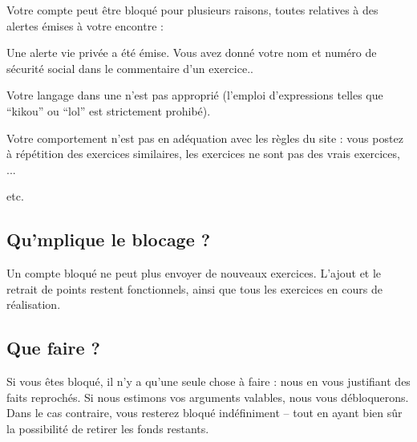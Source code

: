 ﻿Votre compte peut être bloqué pour plusieurs raisons, toutes relatives à des alertes émises à votre encontre :
\item Une alerte vie privée a été émise. Vous avez donné votre nom et numéro de sécurité social dans le commentaire d’un exercice..
\item Votre langage dans une  n’est pas approprié (l’emploi d’expressions telles que “kikou” ou “lol” est strictement prohibé).
\item Votre comportement n’est pas en adéquation avec les règles du site : vous postez à répétition des exercices similaires, les exercices ne sont pas des vrais exercices, ...
\item etc.

\subsection{Qu’mplique le blocage ?}
Un compte bloqué ne peut plus envoyer de nouveaux exercices.
L’ajout et le retrait de points restent fonctionnels, ainsi que tous les exercices en cours de réalisation.

\subsection{Que faire ?}
Si vous êtes bloqué, il n’y a qu’une seule chose à faire : nous  en vous justifiant des faits reprochés. Si nous estimons vos arguments valables, nous vous débloquerons. Dans le cas contraire, vous resterez bloqué indéfiniment -- tout en ayant bien sûr la possibilité de retirer les fonds restants.